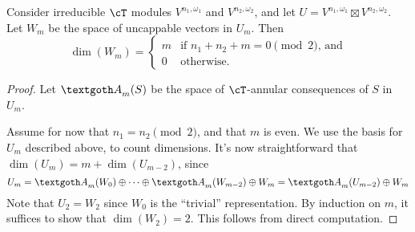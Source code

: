 \documentclass{article}
\begin{document}
\begin{lem}
Consider irreducible $\cT$ modules $V^{n_1, \omega_1}$ and $V^{n_2, \omega_2}$, and let $U=V^{n_1, \omega_1} \boxtimes V^{n_2, \omega_2}$.
Let $W_m$ be the space of uncappable vectors in $U_m$.
Then $$\dim(W_m)=\begin{cases} m & \text{if $n_1 + n_2 + m = 0 \pmod 2$, and} \\ 0 & \text{otherwise.}\end{cases}$$
\end{lem}
\begin{proof}
Let $\gA_m(S)$ be the space of $\cT$-annular consequences of $S$ in $U_m$.

Assume for now that $n_1 = n_2 \pmod 2$, and that $m$ is even. 
We use the basis for $U_m$ described above, to count dimensions.
It's now straightforward that $\dim(U_m)=m+\dim(U_{m-2})$, since
$$
U_{m}
=
\gA_m(W_0)\oplus\cdots\oplus \gA_m(W_{m-2})\oplus W_m 
= 
\gA_m(U_{m-2})\oplus W_m
$$
Note that $U_{2}=W_{2}$ since $W_{0}$ is the ``trivial'' representation. 
By induction on $m$, it suffices to show that $\dim(W_{2})=2$.  
This follows from direct computation.
\end{proof}
\end{document}
